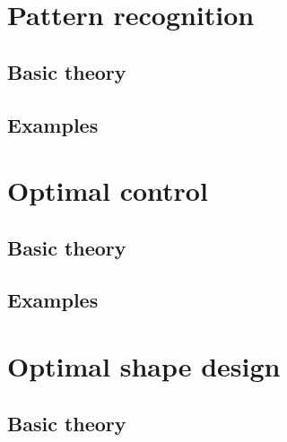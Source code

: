 \documentclass[pdftex, a4paper, 10pt]{book}
\begin{document}
 
\chapter{Pattern recognition}\label{PatternRecognition}


\section{Basic theory}\label{PatternRecognitionBasicTheory}


\section{Examples}\label{ExamplesPatternRecognition}



\chapter{Optimal control}\label{OptimalControl}


\section{Basic theory}\label{BasicTheoryOptimalControl}


\section{Examples}\label{ExamplesOptimalControl}

 
 
\chapter{Optimal shape design}\label{OptimalShapeDesign}


\section{Basic theory}\label{BasicTheoryOptimalShapeDesign}

\end{document}
